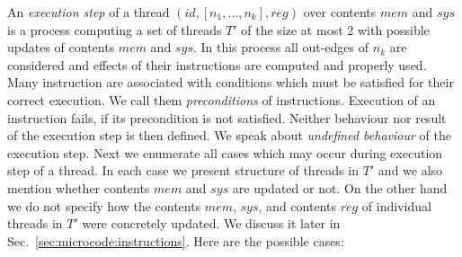 \documentclass[10pt,twocolumn]{article}
\begin{document}
An \emph{execution step} of a thread $
(\mathit{id},[n_1,\ldots,n_k],\mathit{reg}) $ over contents $ \mathit{mem} $ and
$ \mathit{sys} $ is a process computing a set of threads $ T' $ of the size at
most 2 with possible updates of contents $ \mathit{mem} $ and $ \mathit{sys} $.
In this process all out-edges of $ n_k $ are considered and effects of their
instructions are computed and properly used. Many instruction are associated
with conditions which must be satisfied for their correct execution. We call
them \emph{preconditions} of instructions. Execution of an instruction fails, if
its precondition is not satisfied. Neither behaviour nor result of the execution
step is then defined. We speak about \emph{undefined behaviour} of the execution
step. Next we enumerate all cases which may occur during execution step of a
thread. In each case we present structure of threads in $ T' $ and we also
mention whether contents $ \mathit{mem} $ and $ \mathit{sys} $ are updated or
not. On the other hand we do not specify how the contents $ \mathit{mem} $, $
\mathit{sys} $, and contents $ \mathit{reg} $ of individual threads in $ T' $
were concretely updated. We discuss it later in
Sec.~\ref{sec:microcode:instructions}. Here are the possible cases:
\end{document}
